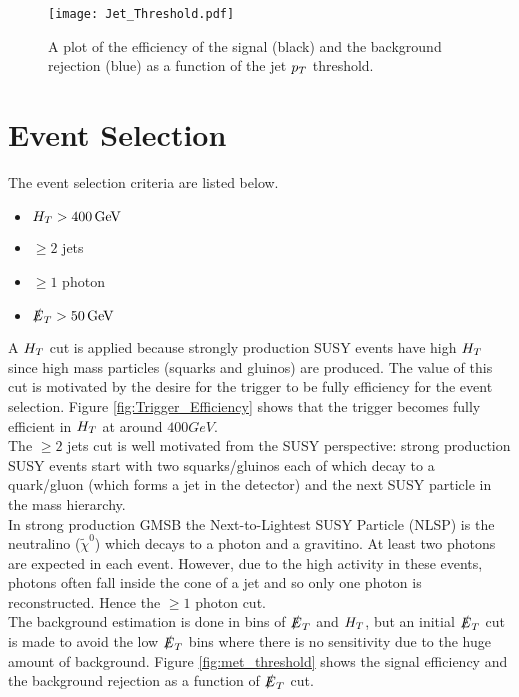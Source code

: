 \begin{figure}
\begin{center}
\texttt{[image: Jet\_Threshold.pdf]}
\end{center}
\caption{A plot of the efficiency of the signal (black) and the background
rejection (blue) as a function of the jet $p_{T}$ threshold.}
\label{fig:Jet_Threshold}
\end{figure}

\section{Event Selection}
\label{sec:Event_Selection}

The event selection criteria are listed below. 

\begin{itemize}
\item $H_{T} > 400 \, \mathrm{GeV}$
\item $\geq 2$ jets
\item $\geq 1$ photon
\item $\slashed{E}_{T} > 50 \, \mathrm{GeV}$
\end{itemize}

A $H_{T}$ cut is applied because strongly production SUSY events have high $H_{T}$
since high mass particles (squarks and gluinos) are produced. The value of this 
cut is motivated by the desire for the trigger to be fully efficiency for the 
event selection. Figure \ref{fig:Trigger_Efficiency} shows that the trigger 
becomes fully efficient in $H_{T}$ at around $400\unit{GeV}$. \\

The $\geq 2$ jets cut is well motivated from the SUSY perspective: strong
production SUSY events start with two squarks/gluinos each of which decay to a 
quark/gluon (which forms a jet in the detector) and the next SUSY particle in 
the mass hierarchy. \\

In strong production GMSB the Next-to-Lightest SUSY Particle (NLSP) is the 
neutralino ($\tilde{\chi}^{0}$) which decays to a photon and a gravitino. At 
least two photons are expected in each event. However, due to the high activity 
in these events, photons often fall inside the cone of a jet and so only one 
photon is reconstructed. Hence the $\geq 1$ photon cut. \\

The background estimation is done in bins of $\slashed{E}_{T}$ and $H_{T}$, but an initial 
$\slashed{E}_{T}$ cut is made to avoid the low $\slashed{E}_{T}$ bins where there is no sensitivity 
due to the huge amount of background. Figure \ref{fig:met_threshold} shows the 
signal efficiency and the background rejection as a function of $\slashed{E}_{T}$ cut.

